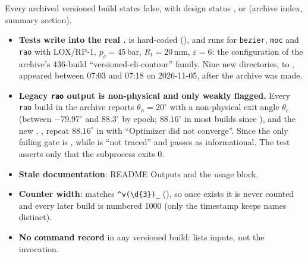 Every archived versioned build states  false, with design status ,  or  (archive index, summary section).
\begin{itemize}
\item \textbf{Tests write into the real .}  is hard-coded (), and  runs  for \texttt{bezier}, \texttt{moc} and \texttt{rao} with LOX/RP-1, $p_c=45$\,bar, $R_t=20$\,mm, $\varepsilon=6$: the configuration of the archive's 436-build ``versioned-cli-contour'' family. Nine new directories,  to , appeared between 07:03 and 07:18 on 2026-11-05, after the archive was made.
\item \textbf{Legacy \texttt{rao} output is non-physical and only weakly flagged.} Every \texttt{rao} build in the archive reports $\theta_n=20^\circ$ with a non-physical exit angle $\theta_e$ (between $-79.97^\circ$ and $88.3^\circ$ by epoch; $88.16^\circ$ in most builds since ), and the new , ,  repeat $88.16^\circ$ in  with ``Optimizer did not converge''. Since  the only failing gate is , while  is ``not traced'' and passes as informational. The test asserts only that the subprocess exits 0.
\item \textbf{Stale documentation}: README Outputs and the  usage block.
\item \textbf{Counter width}:  matches \verb|^v(\d{3})_| (), so once  exists it is never counted and every later build is numbered 1000 (only the timestamp keeps names distinct).
\item \textbf{No command record} in any versioned build:  lists inputs, not the invocation.
\end{itemize}



